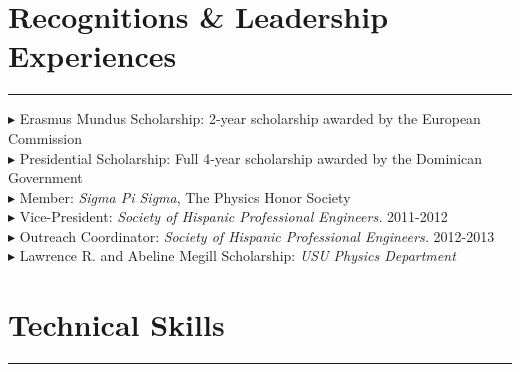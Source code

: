 \documentclass[letterpaper,10pt]{article}
\begin{document}

\section*{Recognitions \& Leadership Experiences }       

\hrule
\vspace{.3 cm}

\hangindent=0.4cm  
 \hspace{.3 cm}  $\blacktriangleright$  Erasmus Mundus Scholarship: 2-year scholarship awarded by the European Commission  \\    
 \hspace{.2 cm}    $\blacktriangleright$  Presidential Scholarship: Full 4-year scholarship awarded by the Dominican Government \\    
\hspace{.2 cm}   $\blacktriangleright$  Member: \emph{Sigma Pi Sigma}, The Physics Honor Society  \\   
\hspace{.2 cm}   $\blacktriangleright$  Vice-President: \emph{Society of Hispanic Professional Engineers.} 2011-2012\\
\hspace{.2 cm}   $\blacktriangleright$  Outreach Coordinator: \emph{Society of Hispanic Professional Engineers.} 2012-2013 \\  
\hspace{.2 cm}   $\blacktriangleright$   Lawrence  R. and Abeline Megill Scholarship: \emph{USU Physics Department}   %



\section*{Technical Skills}
\hrule
\vspace{.3 cm}
\end{document}
